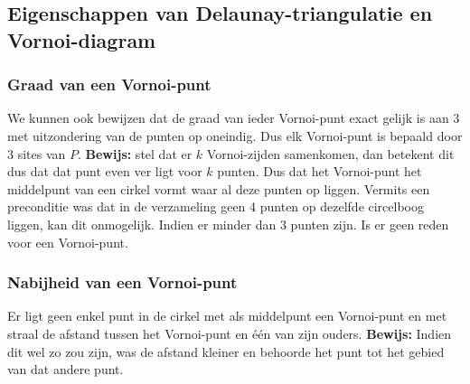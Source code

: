 \documentclass[a4paper,titlepage]{article}
\begin{document}
\subsection{Eigenschappen van Delaunay-triangulatie en Vornoi-diagram}
\subsubsection{Graad van een Vornoi-punt}
We kunnen ook bewijzen dat de graad van ieder Vornoi-punt exact gelijk is aan $3$ met uitzondering van de punten op oneindig. Dus elk Vornoi-punt is bepaald door 3 sites van $P$.
\textbf{Bewijs: }stel dat er $k$ Vornoi-zijden samenkomen, dan betekent dit dus dat dat punt even ver ligt voor $k$ punten. Dus dat het Vornoi-punt het middelpunt van een cirkel vormt waar al deze punten op liggen. Vermits een preconditie was dat in de verzameling geen 4 punten op dezelfde circelboog liggen, kan dit onmogelijk. Indien er minder dan $3$ punten zijn. Is er geen reden voor een Vornoi-punt.
\subsubsection{Nabijheid van een Vornoi-punt}
\label{subsec:emptyCirc}
Er ligt geen enkel punt in de cirkel met als middelpunt een Vornoi-punt en met straal de afstand tussen het Vornoi-punt en \'e\'en van zijn ouders.
\textbf{Bewijs: }Indien dit wel zo zou zijn, was de afstand kleiner en behoorde het punt tot het gebied van dat andere punt.
\end{document}
